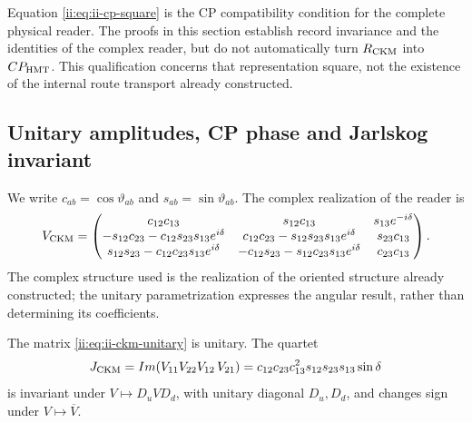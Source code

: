 \begin{remark}
Equation \eqref{ii:eq:ii-cp-square} is the CP compatibility condition for the complete physical reader. The proofs in this section establish record invariance and the identities of the complex reader, but do not automatically turn \(\mathcal R_{\rm CKM}\) into \(CP_{\rm HMT}\). This qualification concerns that representation square, not the existence of the internal route transport already constructed.
\end{remark}

\subsection{Unitary amplitudes, CP phase and Jarlskog invariant}

We write \(c_{ab}=\cos\vartheta_{ab}\) and \(s_{ab}=\sin\vartheta_{ab}\). The complex realization of the reader is
\begingroup
\small
\setlength{\arraycolsep}{3pt}
\begin{equation}
 V_{\rm CKM}=
 \begin{pmatrix}
 c_{12}c_{13}&s_{12}c_{13}&s_{13}e^{-i\delta}\\
 -s_{12}c_{23}-c_{12}s_{23}s_{13}e^{i\delta}&
 c_{12}c_{23}-s_{12}s_{23}s_{13}e^{i\delta}&s_{23}c_{13}\\
 s_{12}s_{23}-c_{12}c_{23}s_{13}e^{i\delta}&
 -c_{12}s_{23}-s_{12}c_{23}s_{13}e^{i\delta}&c_{23}c_{13}
 \end{pmatrix}.
 \label{ii:eq:ii-ckm-unitary}
\end{equation}
\endgroup
The complex structure used is the realization of the oriented structure already constructed; the unitary parametrization expresses the angular result, rather than determining its coefficients.

\begin{proposition}
The matrix \eqref{ii:eq:ii-ckm-unitary} is unitary. The quartet
\begin{equation}
 J_{\rm CKM}
 =\operatorname{Im}
   (V_{11}V_{22}\overline{V_{12}}\,\overline{V_{21}})
 =c_{12}c_{23}c_{13}^2s_{12}s_{23}s_{13}\sin\delta
 \label{ii:eq:ii-jarlskog}
\end{equation}
is invariant under \(V\mapsto D_uVD_d\), with unitary diagonal \(D_u,D_d\), and changes sign under \(V\mapsto\overline V\).
\end{proposition}

